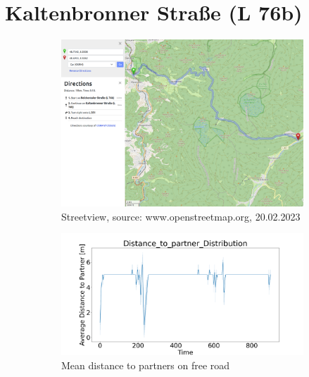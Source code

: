 \section{Kaltenbronner Straße (L 76b)}

\begin{figure}[H]
    \centering
    \begin{subfigure}[b]{0.45\textwidth}
        \centering
        \includegraphics[width=1.0\linewidth]{images/Kaltenbronner/Kaltenbronner.png}
        \caption{Streetview, source: www.openstreetmap.org, 20.02.2023}
    \end{subfigure}
    \hfill
    \begin{subfigure}[b]{0.45\textwidth}
        \centering
        \includegraphics[width=1.0\linewidth]{images/Kaltenbronner/Kaltenbronner _AVG_Distance_to_partner_distribution_free.png}
        \caption{Mean distance to partners on free road}
    \end{subfigure}
    \\
    \begin{subfigure}[b]{0.45\textwidth}

\end{subfigure}
\end{figure}
